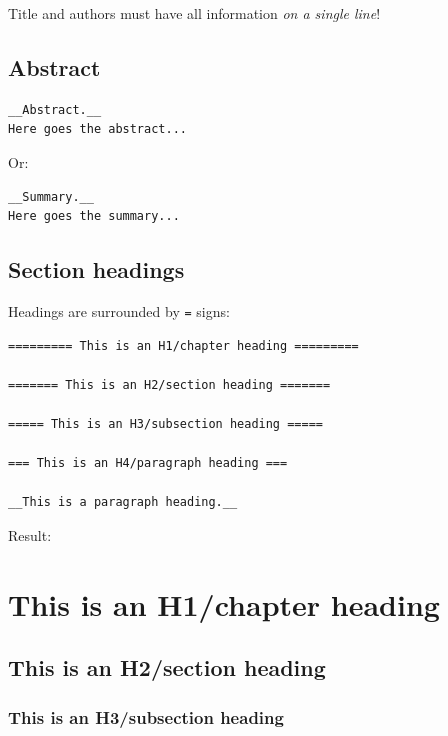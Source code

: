 \documentclass[%
twoside,                 %
final,                   %
chapterprefix=true,      %
open=right               %
10pt]{book}
\newenvironment{graybox1admon}[1][]{
\begin{graybox1mdframed}[frametitle=#1]
}
{
\end{graybox1mdframed}
}
\begin{document}
\begin{graybox1admon}[Notice.]
Title and authors must have all information \emph{on a single line}!
\end{graybox1admon}



\section*{Abstract}

\begin{Verbatim}[numbers=none,fontsize=\fontsize{9pt}{9pt},baselinestretch=0.95]
__Abstract.__
Here goes the abstract...
\end{Verbatim}

Or:
\begin{Verbatim}[numbers=none,fontsize=\fontsize{9pt}{9pt},baselinestretch=0.95]
__Summary.__
Here goes the summary...
\end{Verbatim}


\section*{Section headings}

Headings are surrounded by \Verb!=! signs:
\begin{Verbatim}[numbers=none,fontsize=\fontsize{9pt}{9pt},baselinestretch=0.95]
========= This is an H1/chapter heading =========

======= This is an H2/section heading =======

===== This is an H3/subsection heading =====

=== This is an H4/paragraph heading ===

__This is a paragraph heading.__
\end{Verbatim}

Result:

\chapter{This is an H1/chapter heading}

\section*{This is an H2/section heading}

\subsection*{This is an H3/subsection heading}
\end{document}
